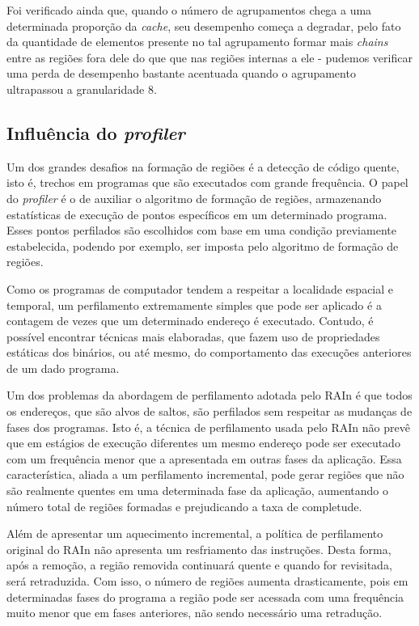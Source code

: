 \documentclass[12pt,twoside]{article}
\newcommand{\cache}{\emph{cache}}
\begin{document}
Foi verificado ainda que, quando o número de agrupamentos chega a uma determinada proporção da \cache, seu desempenho começa a degradar, pelo fato da quantidade de elementos presente no tal agrupamento formar mais \emph{chains} entre as regiões fora dele do que que nas regiões internas a ele - pudemos verificar uma perda de desempenho bastante acentuada quando o agrupamento ultrapassou a granularidade $8$.


\subsection{Influência do \emph{profiler}}
Um dos grandes desafios na formação de regiões é a detecção de código quente, isto é, trechos em programas que são executados com grande frequência. O papel do \emph{profiler} é o de auxiliar o algoritmo de formação de regiões, armazenando estatísticas de execução de pontos específicos em um determinado programa. Esses pontos perfilados são escolhidos com base em uma condição previamente estabelecida, podendo por exemplo, ser imposta pelo algoritmo de formação de regiões. 

Como os programas de computador tendem a respeitar a localidade espacial e temporal, um perfilamento extremamente simples que pode ser aplicado é a contagem de vezes que um determinado endereço é executado. Contudo, é possível encontrar técnicas mais elaboradas, que fazem uso de propriedades estáticas dos binários, ou até mesmo, do comportamento das execuções anteriores de um dado programa.

Um dos problemas da abordagem de perfilamento adotada pelo RAIn é que todos os endereços, que são alvos de saltos, são perfilados sem respeitar as mudanças de fases dos programas. Isto é, a técnica de perfilamento usada pelo RAIn não prevê que em estágios de execução diferentes um mesmo endereço pode ser executado com um frequência menor que a apresentada em outras fases da aplicação. Essa característica, aliada a um perfilamento incremental, pode gerar regiões que não são realmente quentes em uma determinada fase da aplicação, aumentando o número total de regiões formadas e prejudicando a taxa de completude.

Além de apresentar um aquecimento incremental, a política de perfilamento original do RAIn não apresenta um resfriamento das instruções. Desta forma, após a remoção, a região removida continuará quente e quando for revisitada, será retraduzida.  Com isso, o número de regiões aumenta drasticamente, pois em determinadas fases do programa a região pode ser acessada com uma frequência muito menor que em fases anteriores, não sendo necessário uma retradução.
\end{document}
